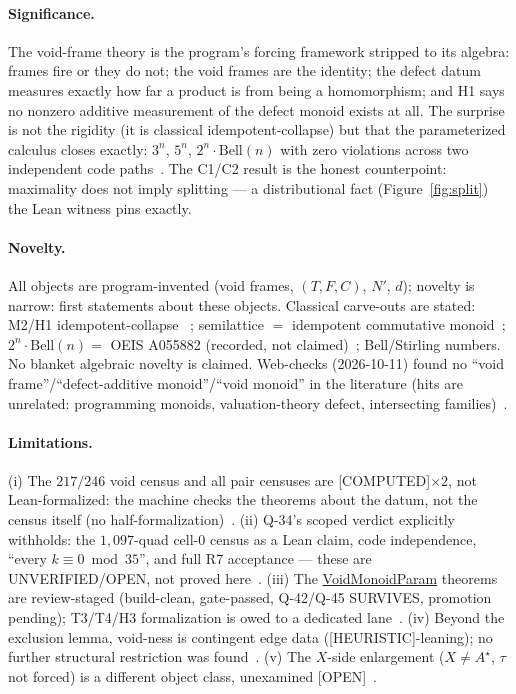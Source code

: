 \documentclass[11pt,a4paper]{article}
\theoremstyle{definition}
\begin{document}
\paragraph{Significance.} The void-frame theory is the program's
forcing framework stripped to its algebra: frames fire or they do not;
the void frames are the identity; the defect datum measures exactly how
far a product is from being a homomorphism; and H1 says no nonzero
additive measurement of the defect monoid exists at all. The surprise is
not the rigidity (it is classical idempotent-collapse) but that the
parameterized calculus closes exactly: $3^n$, $5^n$,
$2^n\!\cdot\!\mathrm{Bell}(n)$ with zero violations across two
independent code paths~\cite{D300}. The C1/C2 result is the honest
counterpoint: maximality does not imply splitting — a distributional
fact (Figure~\ref{fig:split}) the Lean witness pins exactly.

\paragraph{Novelty.} All objects are program-invented (void frames,
$(T,F,C)$, $N'$, $d$); novelty is narrow: first statements about these
objects. Classical carve-outs are stated: M2/H1 idempotent-collapse
~\cite{D291,D322}; semilattice $=$ idempotent commutative
monoid~\cite{D296}; $2^n\!\cdot\!\mathrm{Bell}(n)=$ OEIS A055882
(recorded, not claimed)~\cite{D300}; Bell/Stirling numbers. No blanket
algebraic novelty is claimed. Web-checks (2026-10-11) found no ``void
frame''/``defect-additive monoid''/``void monoid'' in the literature
(hits are unrelated: programming monoids, valuation-theory defect,
intersecting families)~\cite{D291,D296,D300}.

\paragraph{Limitations.} (i) The $217/246$ void census and all pair
censuses are [COMPUTED]$\times2$, not Lean-formalized: the machine
checks the theorems about the datum, not the census itself (no
half-formalization)~\cite{D314,D318}. (ii) Q-34's scoped verdict
explicitly withholds: the $1{,}097$-quad cell-0 census as a Lean claim,
code independence, ``every $k\equiv0\bmod35$'', and full R7 acceptance —
these are UNVERIFIED/OPEN, not proved here~\cite{D314}. (iii) The
\url{VoidMonoidParam} theorems are review-staged (build-clean,
gate-passed, Q-42/Q-45 SURVIVES, promotion pending); T3/T4/H3
formalization is owed to a dedicated lane~\cite{D314,D318}.
(iv) Beyond the exclusion lemma, void-ness is contingent edge data
([HEURISTIC]-leaning); no further structural restriction was
found~\cite{D283}. (v) The $X$-side enlargement ($X\ne A^\star$, $\tau$
not forced) is a different object class, unexamined [OPEN]~\cite{D283}.
\end{document}
